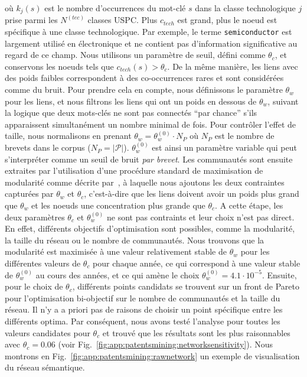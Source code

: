 {où $k_j(s)$ est le nombre d'occurrences du mot-clé $s$ dans la classe technologique $j$ prise parmi les $N^{(tec)}$ classes USPC. Plus $c_{tech}$ est grand, plus le noeud est spécifique à une classe technologique. Par exemple, le terme \texttt{semiconductor} est largement utilisé en électronique et ne contient pas d'information significative au regard de ce champ. Nous utilisons un paramètre de seuil, défini comme $\theta_c$, et conservons les noeuds tels que $c_{tech}(s) > \theta_c$. De la même manière, les liens avec des poids faibles correspondent à des co-occurrences rares et sont considérées comme du bruit. Pour prendre cela en compte, nous définissons le paramètre $\theta_w$ pour les liens, et nous filtrons les liens qui ont un poids en dessous de $\theta_w$, suivant la logique que deux mots-clés ne sont pas connectés ``par chance'' s'ils apparaissent simultanément un nombre minimal de fois. Pour contrôler l'effet de taille, nous normalisons en prenant $\theta_w = \theta_w^{(0)}\cdot N_P$ où $N_P$ est le nombre de brevets dans le corpus ($N_P = \left|\mathcal{P} \right|$). $\theta_w^{(0)}$ est ainsi un paramètre variable qui peut s'interpréter comme un seuil de bruit \emph{par brevet}. Les communautés sont ensuite extraites par l'utilisation d'une procédure standard de maximisation de modularité comme décrite par~\cite{clauset2004finding}, à laquelle nous ajoutons les deux contraintes capturées par $\theta_w$ et $\theta_c$, c'est-à-dire que les liens doivent avoir un poids plus grand que $\theta_w$ et les noeuds une concentration plus grande que $\theta_c$. A cette étape, les deux paramètres $\theta_c$ et $\theta_w^{(0)}$ ne sont pas contraints et leur choix n'est pas direct. En effet, différents objectifs d'optimisation sont possibles, comme la modularité, la taille du réseau ou le nombre de communautés. Nous trouvons que la modularité est maximisée à une valeur relativement stable de $\theta_w$ pour les différentes valeurs de $\theta_c$ pour chaque année, ce qui correspond à une valeur stable de $\theta_w^{(0)}$ au cours des années, et ce qui amène le choix $\theta_w^{(0)} = 4.1\cdot 10^{-5}$. Ensuite, pour le choix de $\theta_c$, différents points candidats se trouvent sur un front de Pareto pour l'optimisation bi-objectif sur le nombre de communautés et la taille du réseau. Il n'y a a priori pas de raisons de choisir un point spécifique entre les différents optima. Par conséquent, nous avons testé l'analyse pour toutes les valeurs candidates pour $\theta_c$ et trouvé que les résultats sont les plus raisonnables avec $\theta_c = 0.06$ (voir Fig.~\ref{fig:app:patentsmining:networksensitivity}). Nous montrons en Fig.~\ref{fig:app:patentsmining:rawnetwork} un exemple de visualisation du réseau sémantique.
}


